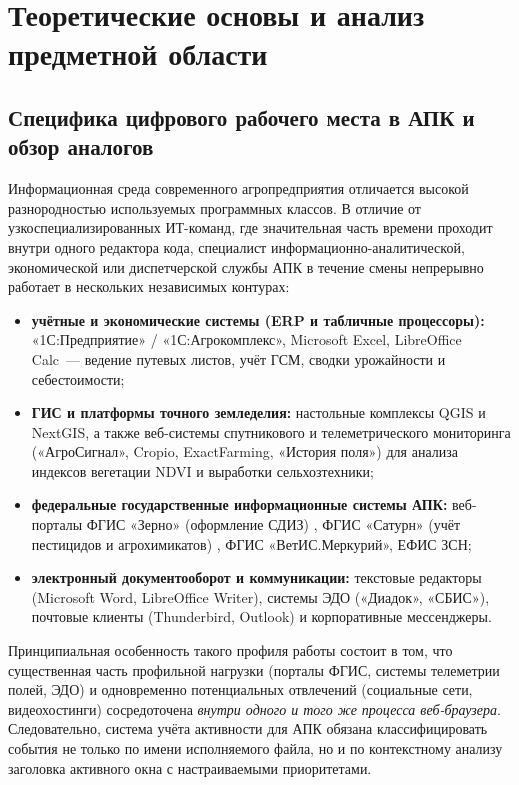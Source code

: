 \documentclass{timcw}
\begin{document}
\newpage
\chapter{Теоретические основы и анализ предметной области}

\section{Специфика цифрового рабочего места в АПК и обзор аналогов}

Информационная среда современного агропредприятия отличается высокой разнородностью используемых программных классов. В отличие от узкоспециализированных ИТ-команд, где значительная часть времени проходит внутри одного редактора кода, специалист информационно-аналитической, экономической или диспетчерской службы АПК в течение смены непрерывно работает в нескольких независимых контурах:
\begin{itemize}
  \item \textbf{учётные и экономические системы (ERP и табличные процессоры):} «1С:Предприятие» / «1С:Агрокомплекс», Microsoft Excel, LibreOffice Calc~--- ведение путевых листов, учёт ГСМ, сводки урожайности и себестоимости;
  \item \textbf{ГИС и платформы точного земледелия:} настольные комплексы QGIS \cite{qgis_docs} и NextGIS, а также веб-системы спутникового и телеметрического мониторинга («АгроСигнал», Cropio, ExactFarming, «История поля») для анализа индексов вегетации NDVI и выработки сельхозтехники;
  \item \textbf{федеральные государственные информационные системы АПК:} веб-порталы ФГИС «Зерно» (оформление СДИЗ) \cite{fgis_zerno}, ФГИС «Сатурн» (учёт пестицидов и агрохимикатов) \cite{fgis_saturn}, ФГИС «ВетИС.Меркурий», ЕФИС ЗСН;
  \item \textbf{электронный документооборот и коммуникации:} текстовые редакторы (Microsoft Word, LibreOffice Writer), системы ЭДО («Диадок», «СБИС»), почтовые клиенты (Thunderbird, Outlook) и корпоративные мессенджеры.
\end{itemize}

Принципиальная особенность такого профиля работы состоит в том, что существенная часть профильной нагрузки (порталы ФГИС, системы телеметрии полей, ЭДО) и одновременно потенциальных отвлечений (социальные сети, видеохостинги) сосредоточена \emph{внутри одного и того же процесса веб-браузера}. Следовательно, система учёта активности для АПК обязана классифицировать события не только по имени исполняемого файла, но и по контекстному анализу заголовка активного окна с настраиваемыми приоритетами.
\end{document}
